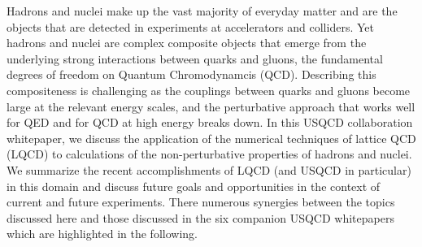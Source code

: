 Hadrons and nuclei make up the vast majority of everyday matter and are the objects that are detected in experiments at accelerators and colliders. Yet hadrons and nuclei are complex composite objects that emerge from the underlying strong interactions between quarks and gluons, the fundamental degrees of freedom on Quantum Chromodynamcis (QCD). Describing this compositeness is challenging as the couplings between quarks and gluons become large at the relevant energy scales, and the perturbative approach that works well for QED and for QCD at high energy breaks down.
%
In this USQCD collaboration whitepaper, we discuss the application of the numerical techniques of lattice QCD (LQCD) to calculations of the non-perturbative properties of hadrons and nuclei. We summarize the  recent accomplishments of LQCD (and USQCD in particular) in this domain and discuss future goals and opportunities in the context of current and future experiments. There  numerous synergies between the topics discussed here and those discussed in  the six companion USQCD whitepapers which are highlighted in the following.

